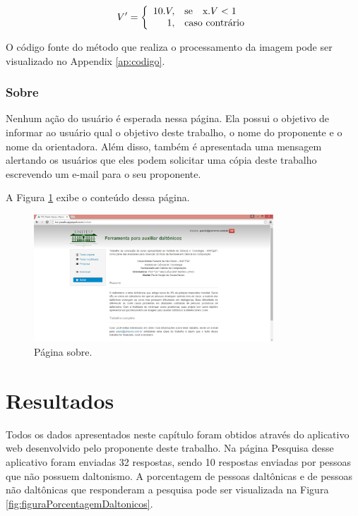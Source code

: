 \documentclass[	12pt, Times, openright, twoside, a4paper, english, brazil]{abntex2}
\begin{document}
\begin{equation}
\label{eq:exemploV}
V'=\left\{
\begin{array}{rl}
       10 . V,&\mbox{se}\quad $x$ . V < 1 \\
       1,&\mbox{caso contrário}
\end{array}\right.
\end{equation}


O código fonte do método que realiza o processamento da imagem pode ser visualizado no Appendix \ref{ap:codigo}.


\subsection{Sobre}

Nenhum ação do usuário é esperada nessa página. Ela possui o objetivo de informar ao usuário qual o objetivo deste trabalho, o nome do proponente e o nome da orientadora. Além disso, também é apresentada uma mensagem alertando os usuários que eles podem solicitar uma cópia deste trabalho escrevendo um e-mail para o seu proponente.

A Figura \ref{fig:figuraSobre} exibe o conteúdo dessa página.

\begin{figure}[!htb]
\centering \includegraphics[width=0.8\textwidth]{telaSobre.jpg}
\caption{Página sobre.} \label{fig:figuraSobre}
\end{figure}

\chapter{Resultados}
\label{cap:resultados}

Todos os dados apresentados neste capítulo foram obtidos através do aplicativo web desenvolvido pelo proponente deste trabalho. Na página Pesquisa desse aplicativo foram enviadas 32 respostas, sendo 10 respostas enviadas por pessoas que não possuem daltonismo. A porcentagem de pessoas daltônicas e de pessoas não daltônicas que responderam a pesquisa pode ser visualizada na Figura \ref{fig:figuraPorcentagemDaltonicos}.
\end{document}
